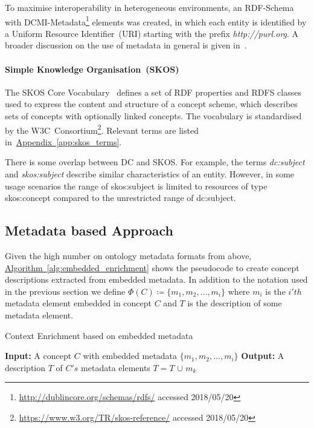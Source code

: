 To maximise interoperability in heterogeneous environments, an RDF-Schema with DCMI-Metadata\footnote{\url{http://dublincore.org/schemas/rdfs/} accessed 2018/05/20} elements was created, in which each entity is identified by a Uniform Resource Identifier~(URI) starting with the prefix \emph{http://purl.org}. A broader discussion on the use of metadata in general is given in~\cite{nilsson2010}.  

\paragraph{Simple Knowledge Organisation~(SKOS)}
The SKOS Core Vocabulary~\cite{skos2005} defines a set of RDF properties and RDFS classes
used to express the content and structure of a concept scheme, which describes sets of concepts with optionally linked concepts. The vocabulary is standardised by the W3C~Consortium\footnote{\url{https://www.w3.org/TR/skos-reference/} accessed 2018/05/20}. Relevant terms are listed in~\hyperref[app:skos_terms]{Appendix~\ref*{app:skos_terms}}.
	
There is some overlap between DC and SKOS. For example, the terms \textit{dc:subject} and \textit{skos:subject} describe similar characteristics of an entity. However, in some usage scenarios the range of skos:subject is limited to resources of type skos:concept compared to the unrestricted range of dc:subject. 


\subsection{Metadata based Approach}\label{sec:enrichment_metaData_approach}
Given the high number on ontology metadata formats from above, \hyperref[alg:embedded_enrichment]{Algorithm~\ref*{alg:embedded_enrichment}} shows the pseudocode to create concept descriptions extracted from embedded metadata. In addition to the notation used in the previous section we define $\Phi(C) \coloneqq \{m_1, m_2, \ldots, m_i \}$ where $m_i$ is the $i'th$ metadata element embedded in concept $C$ and $T$ is the description of some metadata element.

\begin{algorithm}
	\caption{Context Enrichment based on embedded metadata}\label{alg:embedded_enrichment}
	\begin{algorithmic}[1]
		\newline
			\textbf{Input:} A concept $C$ with embedded metadata $\{m_1, m_2, \ldots, m_i \}$\newline
			\textbf{Output:} A description $T$ of $C's$ metadata elements\newline
				\State $T=T$ $\cup$ $m_k$
			\EndFor
		\EndProcedure
	\end{algorithmic}
\end{algorithm}

